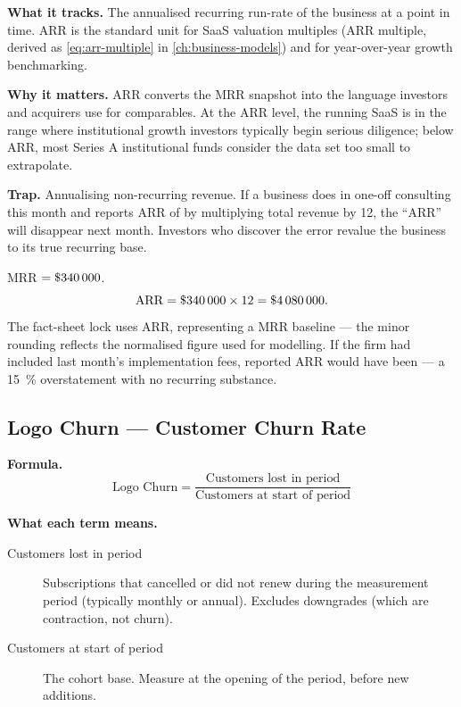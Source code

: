 \textbf{What it tracks.} The annualised recurring run-rate of the business at a point in
time. ARR is the standard unit for SaaS valuation multiples (ARR multiple, derived as
\cref{eq:arr-multiple} in \cref{ch:business-models}) and for year-over-year growth
benchmarking.

\textbf{Why it matters.} ARR converts the MRR snapshot into the language investors and
acquirers use for comparables. At the  ARR level, the running SaaS is in the
range where institutional growth investors typically begin serious diligence; below
 ARR, most Series A institutional funds consider the data set too small to
extrapolate.

\textbf{Trap.} Annualising non-recurring revenue. If a business does  in
one-off consulting this month and reports ARR of  by multiplying total revenue
by 12, the ``ARR'' will disappear next month. Investors who discover the error revalue the
business to its true recurring base.

\begin{example}
MRR $= \$\num{340000}$.
\[
  \mathrm{ARR} = \$\num{340000} \times 12 = \$\num{4080000}.
\]
The fact-sheet lock uses  ARR, representing a  MRR baseline ---
the minor rounding reflects the normalised figure used for modelling. If the firm had
included last month's implementation fees, reported ARR would have been  --- a
\qty{15}{\percent} overstatement with no recurring substance.
\end{example}


\subsection{Logo Churn --- Customer Churn Rate}

\textbf{Formula.}
\[
  \text{Logo Churn} = \frac{\text{Customers lost in period}}{\text{Customers at start of period}}
\]

\textbf{What each term means.}
\begin{description}
  \item[Customers lost in period] Subscriptions that cancelled or did not renew during the
    measurement period (typically monthly or annual). Excludes downgrades (which are
    contraction, not churn).
  \item[Customers at start of period] The cohort base. Measure at the opening of the period,
    before new additions.
\end{description}

